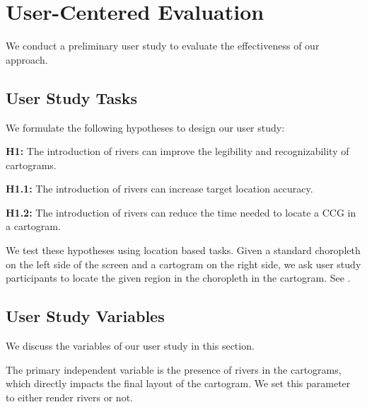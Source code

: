 \newcommand{\pCount}{24 }
\section{User-Centered Evaluation}

We conduct a preliminary user study to evaluate the effectiveness of our approach.

\subsection{User Study Tasks}

We formulate the following hypotheses to design our user study:

\textbf{H1:} The introduction of rivers can improve the legibility and recognizability of cartograms.

\textbf{H1.1:} The introduction of rivers can increase target location accuracy.

\textbf{H1.2:} The introduction of rivers can reduce the time needed to locate a CCG in a cartogram.

We test these hypotheses using location based tasks. Given a standard choropleth on the left side of the screen and a cartogram on the right side, we ask user study participants to locate the given region in the choropleth in the cartogram. See .

\subsection{User Study Variables}

We discuss the variables of our user study in this section.

The primary independent variable is the presence of rivers in the cartograms, which directly impacts the final layout of the cartogram. We set this parameter to either render rivers or not.



